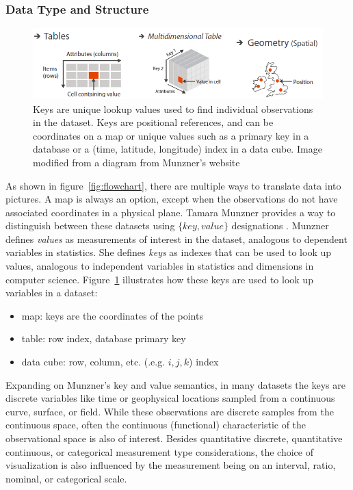 \documentclass[letterpaper,onecolumn,titlepage]{Ythesis}
\begin{document}
\subsubsection{Data Type and Structure}

\begin{figure}[H]
 \includegraphics[width=\textwidth]{intro/munzner_datatypes}
\caption{Keys are unique lookup values used to find individual observations in the dataset. Keys are positional references, and can be coordinates on a map or unique values such as a primary key in a database or a (time, latitude, longitude) index in a data cube. Image modified from a diagram from Munzner's website \cite{_visualization_????}}
\label{fig:munzner_datatypes}
\end{figure}

As shown in figure~\ref{fig:flowchart}, there are multiple ways to translate data into pictures. A map is always an option, except when the observations do not have associated coordinates in a physical plane. Tamara Munzner provides a way to distinguish between these datasets using $\{key, value\}$ designations \cite{munzner_visualization_2014}. Munzner defines \textit{values} as measurements of interest in the dataset, analogous to dependent variables in statistics. She defines \textit{keys} as indexes that can be used to look up values, analogous to independent variables in statistics and dimensions in computer science. Figure~\ref{fig:munzner_datatypes} illustrates how these keys are used to look up variables in a dataset: 
\begin{itemize}
	\item map: keys are the coordinates of the points
	\item table: row index, database primary key
	\item data cube: row, column, etc. (.e.g. $i,j,k$) index
\end{itemize}

Expanding on Munzner's key and value semantics, in many datasets the keys are discrete variables like time or geophysical locations sampled from a continuous curve, surface, or field. While these observations are discrete samples from the continuous space, often the continuous (functional) characteristic\cite{ramsay_functional_2006,muller_functional_2006} of the observational space is also of interest. Besides quantitative discrete, quantitative continuous, or categorical measurement type considerations, the choice of visualization is also influenced by the measurement being on an interval, ratio, nominal, or categorical scale. 
\end{document}
